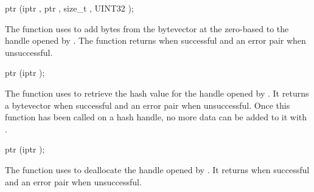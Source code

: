 \begin{function}
  ptr (iptr , ptr , size\_t , UINT32 );
\end{function}\antipar

The  function uses  to add
 bytes from the bytevector  at the zero-based
 to the  handle opened by
. The function returns  when successful
and an error pair when unsuccessful.

\begin{function}
  ptr (iptr );
\end{function}

The  function uses  to
retrieve the hash value for the  handle opened by
. It returns a bytevector when successful and an
error pair when unsuccessful. Once this function has been called on a
hash handle, no more data can be added to it with
.

\begin{function}
  ptr (iptr );
\end{function}

The  function uses  to
deallocate the  handle opened by . It
returns  when successful and an error pair when
unsuccessful.
